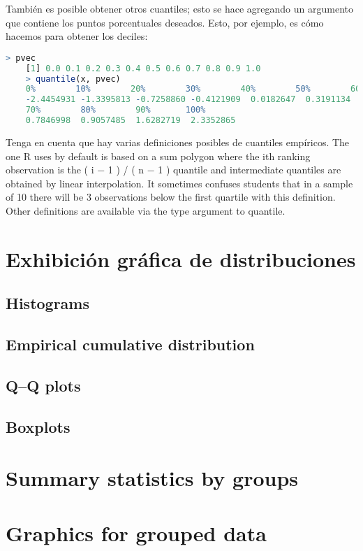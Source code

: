También es posible obtener otros cuantiles; esto se hace agregando un argumento
que contiene los puntos porcentuales deseados. Esto, por ejemplo, es cómo
hacemos para obtener los deciles:


\begin{lstlisting}[language=R]
    > pvec
    [1] 0.0 0.1 0.2 0.3 0.4 0.5 0.6 0.7 0.8 0.9 1.0
    > quantile(x, pvec)
    0%        10%        20%        30%        40%        50%        60%
    -2.4454931 -1.3395813 -0.7258860 -0.4121909  0.0182647  0.3191134  0.6880762
    70%        80%        90%       100%
    0.7846998  0.9057485  1.6282719  2.3352865
\end{lstlisting}

Tenga en cuenta que hay varias definiciones posibles de cuantiles empíricos.
The one R uses by default is based on a sum polygon where the ith ranking
observation is the ( i − 1 ) / ( n − 1 ) quantile and intermediate quantiles are
obtained by linear interpolation. It sometimes confuses students that in
a sample of 10 there will be 3 observations below the first quartile with
this definition. Other definitions are available via the type argument to
quantile.

\section{Exhibición gráfica de distribuciones}



\subsection{Histograms}
\subsection{Empirical cumulative distribution}
\subsection{Q–Q plots}\label{qqplots}
\subsection{Boxplots}
\section{Summary statistics by groups}
\section{Graphics for grouped data}
